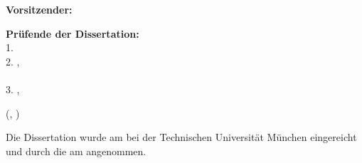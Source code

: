 \begin{titlepage}
\begin{textblock*}{}
        \textbf{Vorsitzender:}\\
        \hspace{8mm}\hphantom{1. } \chairman{}

        \vspace{2mm}

        \textbf{Pr\"ufende der Dissertation:}\\
        \hspace{8mm}1. \supervisorA{}\\
        \hspace{8mm}2. \supervisorB{}
          ,\\\hspace{8mm}\hphantom{2. }\supervisorBuni{}\\
          \hspace{8mm}3. \supervisorC{} 
          ,\\\hspace{8mm}\hphantom{3. }\supervisorCuni
%        
        

    \end{textblock*}



    \begin{textblock*}{}(, \datevpos)
        \raggedright

        Die Dissertation wurde am \subdate{} bei der Technischen Universit\"at
        M\"unchen eingereicht und durch die {\facultyger{}}
          am \accdate{}
        angenommen.

    \end{textblock*}

\end{titlepage}

\mbox{}
\newpage
\thispagestyle{empty}
\mbox{}
\newpage

\setcounter{page}{1}
\thispagestyle{empty}

%
%
